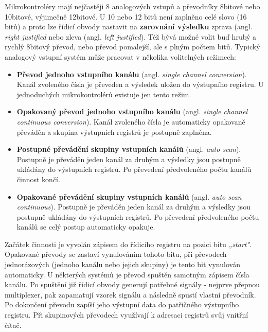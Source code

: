       Mikrokontroléry mají nejčastěji 8 analogových vstupů a převodníky 8bitové nebo 10bitové, 
      výjimečně 12bitové. U 10 nebo 12 bitů není zaplněno celé slovo (16 bitů) a proto lze řídicí 
      obvody nastavit na \textbf{zarovnání výsledku} zprava (angl. \emph{right justified} nebo 
      zleva (angl. \emph{left justified}). Též bývá možné volit buď hrubý a rychlý 8bitový převod, 
      nebo převod pomalejší, ale s plným počtem bitů. Typický analogový vstupní systém může 
      pracovat v několika volitelných režimech:
      \begin{itemize}\addtolength{\itemsep}{-0.5\baselineskip}
        \item \textbf{Převod jednoho vstupního kanálu} (angl. \emph{single channel conversion}).  
              Kanál zvoleného čísla je převeden a výsledek uložen do výstupního registru. U 
              jednoduchých mikrokontrolérů existuje jen tento režim.
        \item \textbf{Opakovaný převod jednoho vstupního kanálu} (angl. \emph{single channel     
              continuous conversion}). Kanál zvoleného čísla je automaticky opakovaně převáděn a 
              skupina výstupních registrů je postupně zaplněna.
        \item \textbf{Postupné převádění skupiny vstupních kanálů} (angl. \emph{auto scan}).  
              Postupně je převáděn jeden kanál za druhým a výsledky jsou postupně ukládány do 
              výstupních registrů. Po převedení předvoleného počtu kanálů činnost končí.
        \item \textbf{Opakované převádění skupiny vstupních kanálů} (angl. \emph{auto scan          
              continuous}). Postupně je převáděn jeden kanál za druhým a výsledky jsou postupně 
              ukládány do výstupních registrů. Po převedení předvoleného počtu kanálů se celý 
              postup automaticky opakuje.        
      \end{itemize}
      
      Začátek činnosti je vyvolán zápisem do řídicího registru na pozici bitu \emph{„start"}. 
      Opakované převody se zastaví vynulováním tohoto bitu, při převodech jednorázových (jednoho 
      kanálu nebo jejich skupiny) je tento bit vynulován automaticky. U některých systémů je převod 
      spuštěn samotným zápisem čísla kanálu. Po spuštění již řídicí obvody generují potřebné 
      signály - nejprve přepnou multiplexer, pak zapamatují vzorek signálu a následně spustí 
      vlastní převodník. Po dokončení převodu zapíší jeho výstupní data do patřičného výstupního 
      registru. Při skupinových převodech využívají k adresaci registrů svůj vnitřní čítač.
      
